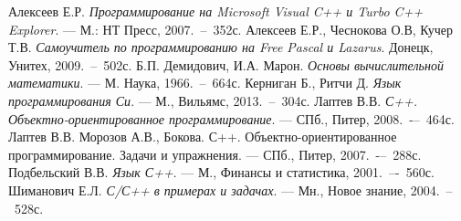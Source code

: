 \begin{thebibliography}{9}
 Алексеев Е.Р. \emph{Программирование на Microsoft Visual C++ и Turbo C++ Explorer}. --- М.: НТ Пресс, 2007.~--~352с. 
 Алексеев Е.Р., Чеснокова О.В, Кучер Т.В. \emph{Самоучитель по программированию на Free Pascal и Lazarus}. Донецк, Унитех, 2009.~--~502с. 
 Б.П. Демидович, И.А. Марон. \emph{Основы вычислительной математики}. --- М. Наука, 1966.~--~664с.
 Керниган Б., Ритчи Д. \emph{Язык программирования Си}. ---  М., Вильямс, 2013.~--~304с.
 Лаптев В.В. \emph{С++. Объектно-ориентированное программирование}. --- СПб., Питер, 2008.~-–~464с.
 Лаптев В.В. Морозов А.В., Бокова. С++. Объектно-ориентированное программирование. Задачи и упражнения. --- СПб., Питер, 2007.~-–~288с.
 Подбельский В.В. \emph{Язык С++}. --- М., Финансы и статистика, 2001.~–-~560с.
 Шиманович Е.Л. \emph{С/С++ в примерах и задачах}. --- Мн., Новое знание, 2004.~--~528с.
\end{thebibliography}
